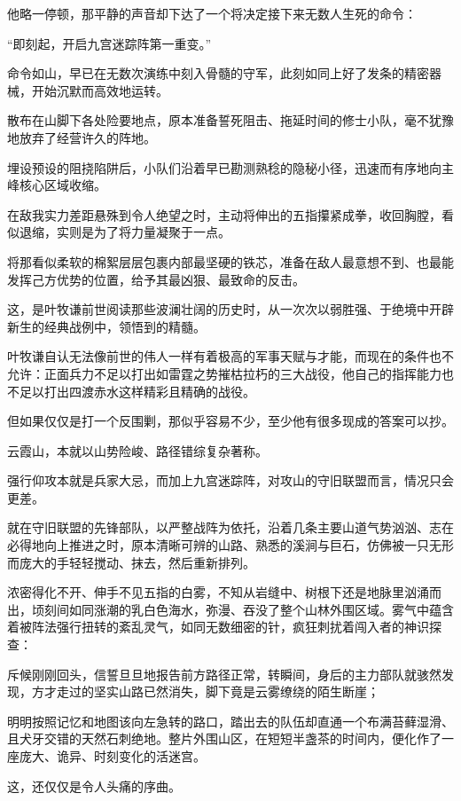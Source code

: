 他略一停顿，那平静的声音却下达了一个将决定接下来无数人生死的命令：

“即刻起，开启九宫迷踪阵第一重变。”

命令如山，早已在无数次演练中刻入骨髓的守军，此刻如同上好了发条的精密器械，开始沉默而高效地运转。

散布在山脚下各处险要地点，原本准备誓死阻击、拖延时间的修士小队，毫不犹豫地放弃了经营许久的阵地。

埋设预设的阻挠陷阱后，小队们沿着早已勘测熟稔的隐秘小径，迅速而有序地向主峰核心区域收缩。

在敌我实力差距悬殊到令人绝望之时，主动将伸出的五指攥紧成拳，收回胸膛，看似退缩，实则是为了将力量凝聚于一点。

将那看似柔软的棉絮层层包裹内部最坚硬的铁芯，准备在敌人最意想不到、也最能发挥己方优势的位置，给予其最凶狠、最致命的反击。

这，是叶牧谦前世阅读那些波澜壮阔的历史时，从一次次以弱胜强、于绝境中开辟新生的经典战例中，领悟到的精髓。

叶牧谦自认无法像前世的伟人一样有着极高的军事天赋与才能，而现在的条件也不允许：正面兵力不足以打出如雷霆之势摧枯拉朽的三大战役，他自己的指挥能力也不足以打出四渡赤水这样精彩且精确的战役。

但如果仅仅是打一个反围剿，那似乎容易不少，至少他有很多现成的答案可以抄。

\vspace{2em}

云霞山，本就以山势险峻、路径错综复杂著称。

强行仰攻本就是兵家大忌，而加上九宫迷踪阵，对攻山的守旧联盟而言，情况只会更差。

就在守旧联盟的先锋部队，以严整战阵为依托，沿着几条主要山道气势汹汹、志在必得地向上推进之时，原本清晰可辨的山路、熟悉的溪涧与巨石，仿佛被一只无形而庞大的手轻轻搅动、抹去，然后重新排列。

浓密得化不开、伸手不见五指的白雾，不知从岩缝中、树根下还是地脉里汹涌而出，顷刻间如同涨潮的乳白色海水，弥漫、吞没了整个山林外围区域。雾气中蕴含着被阵法强行扭转的紊乱灵气，如同无数细密的针，疯狂刺扰着闯入者的神识探查：

斥候刚刚回头，信誓旦旦地报告前方路径正常，转瞬间，身后的主力部队就骇然发现，方才走过的坚实山路已然消失，脚下竟是云雾缭绕的陌生断崖；

明明按照记忆和地图该向左急转的路口，踏出去的队伍却直通一个布满苔藓湿滑、且犬牙交错的天然石刺绝地。整片外围山区，在短短半盏茶的时间内，便化作了一座庞大、诡异、时刻变化的活迷宫。

这，还仅仅是令人头痛的序曲。

